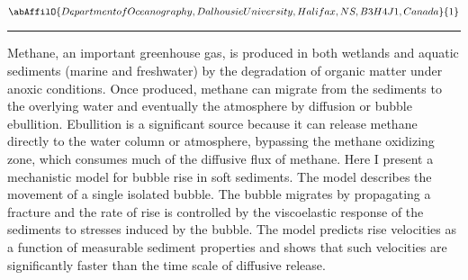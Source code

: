 \begin{center}
   \vspace{2 mm} \begin{center}
    \vspace{2 mm}\begin{center}
  
  $\abAffilO{Department of Oceanography, Dalhousie University, Halifax, NS, B3H 4J1, Canada}{1}$

  \end{center}
  \vspace{2 mm}
  \end{center}\end{center}
  \begin{center}\rule{0.70\linewidth}{0.5 pt}\end{center}

\noindent Methane, an important greenhouse gas, is produced in both wetlands and aquatic sediments (marine and freshwater) by the degradation of organic matter under anoxic conditions.  Once produced, methane can migrate from the sediments to the overlying water and eventually the atmosphere by diffusion or bubble ebullition.   Ebullition is a significant source because it can release methane directly to the water column or atmosphere, bypassing the methane oxidizing zone, which consumes much of the diffusive flux of methane.  Here I present a mechanistic model for bubble rise in soft sediments.   The model describes the movement of a single isolated bubble.  The bubble migrates by propagating a fracture and the rate of rise is controlled by the viscoelastic response of the sediments to stresses induced by the bubble.  The model predicts rise velocities as a function of measurable sediment properties and shows that such velocities are significantly faster than the time scale of diffusive release.

